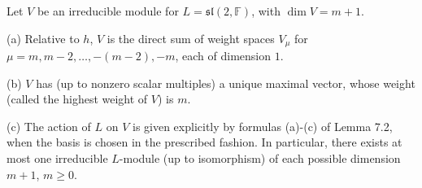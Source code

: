 Let $V$ be an irreducible module for $L = \mathfrak{sl}(2, \mathbb{F})$, with $\dim V = m+1$.

(a) Relative to $h$, $V$ is the direct sum of weight spaces $V_\mu$ for $\mu = m, m-2, \ldots, -(m-2), -m$, each of dimension $1$.

(b) $V$ has (up to nonzero scalar multiples) a unique maximal vector, whose weight (called the highest weight of $V$) is $m$.

(c) The action of $L$ on $V$ is given explicitly by formulas (a)-(c) of Lemma 7.2, when the basis is chosen in the prescribed fashion. In particular, there exists at most one irreducible $L$-module (up to isomorphism) of each possible dimension $m+1$, $m \geq 0$.
